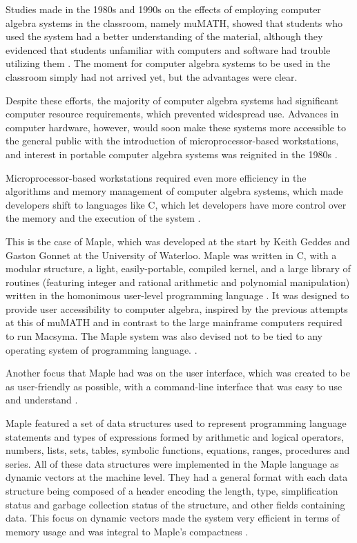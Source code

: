 Studies made in the 1980s and 1990s on the effects of employing computer algebra systems in the classroom, namely muMATH, showed that students who used the system had a better understanding of the material, although they evidenced that students unfamiliar with computers and software had trouble utilizing them \parencite{aspetsberger1984experiments,mayes1992effects}. The moment for computer algebra systems to be used in the classroom simply had not arrived yet, but the advantages were clear.

Despite these efforts, the majority of computer algebra systems had significant computer resource requirements, which prevented widespread use. Advances in computer hardware, however, would soon make these systems more accessible to the general public with the introduction of microprocessor-based workstations, and interest in portable computer algebra systems was reignited in the 1980s \parencite{geddes1992algorithms}.

Microprocessor-based workstations required even more efficiency in the algorithms and memory management of computer algebra systems, which made developers shift to languages like C, which let developers have more control over the memory and the execution of the system \parencite{geddes1992algorithms}.

This is the case of Maple, which was developed at the start by Keith Geddes and Gaston Gonnet at the University of Waterloo. Maple was written in C, with a modular structure, a light, easily-portable, compiled kernel, and a large library of routines (featuring integer and rational arithmetic and polynomial manipulation) written in the homonimous user-level programming language \parencite{geddes1992algorithms}. It was designed to provide user accessibility to computer algebra, inspired by the previous attempts at this of muMATH and in contrast to the large mainframe computers required to run Macsyma. The Maple system was also devised not to be tied to any operating system of programming language. \parencite{char1983design}.

Another focus that Maple had was on the user interface, which was created to be as user-friendly as possible, with a command-line interface that was easy to use and understand \parencite{char1983design}.

Maple featured a set of data structures used to represent programming language statements and types of expressions formed by arithmetic and logical operators, numbers, lists, sets, tables, symbolic functions, equations, ranges, procedures and series. All of these data structures were implemented in the Maple language as dynamic vectors at the machine level. They had a general format with each data structure being composed of a header encoding the length, type, simplification status and garbage collection status of the structure, and other fields containing data. This focus on dynamic vectors made the system very efficient in terms of memory usage and was integral to Maple's compactness \parencite{char1983design}.

